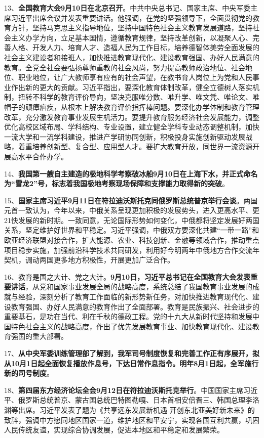 13、{\textbf{全国教育大会9月10日在北京召开}}。中共中央总书记、国家主席、中央军委主席习近平出席会议并发表重要讲话。他强调，在党的坚强领导下，全面贯彻党的教育方针，坚持马克思主义指导地位，坚持中国特色社会主义教育发展道路，坚持社会主义办学方向，立足基本国情，遵循教育规律，坚持改革创新，以凝聚人心、完善人格、开发人力、培育人才、造福人民为工作目标，培养德智体美劳全面发展的社会主义建设者和接班人，加快推进教育现代化、建设教育强国、办好人民满意的教育。全党全社会要弘扬尊师重教的社会风尚，努力提高教师政治地位、社会地位、职业地位，让广大教师享有应有的社会声望，在教书育人岗位上为党和人民事业作出新的更大的贡献。习近平指出，要深化教育体制改革，健全立德树人落实机制，扭转不科学的教育评价导向，坚决克服唯分数、唯升学、唯文凭、唯论文、唯帽子的顽瘴痼疾，从根本上解决教育评价指挥棒问题。要深化办学体制和教育管理改革，充分激发教育事业发展生机活力。要提升教育服务经济社会发展能力，调整优化高校区域布局、学科结构、专业设置，建立健全学科专业动态调整机制，加快一流大学和一流学科建设，推进产学研协同创新，积极投身实施创新驱动发展战略，着重培养创新型、复合型、应用型人才。要扩大教育开放，同世界一流资源开展高水平合作办学。

14、{\textbf{我国第一艘自主建造的极地科学考察破冰船9月10日在上海下水，并正式命名为``雪龙2''号，标志着我国极地考察现场保障和支撑能力取得新的突破}}。

15、{\textbf{国家主席习近平9月11日在符拉迪沃斯托克同俄罗斯总统普京举行会谈}}。两国元首一致认为，今年以来，中俄关系呈现更加积极的发展势头，进入更高水平、更21快发展的新时期。一致同意，无论国际形势如何变化，中俄都将坚定发展好两国关系，坚定维护好世界和平稳定。习近平强调，中俄双方要深化共建``一带一路''和欧亚经济联盟对接合作，扩大能源、农业、科技创新、金融等领域合作，推动重点项目稳步实施，加强前沿科学技术共同研发，利用好今明两年中俄地方合作交流年契机，调动两国更多地方积极性，开展更加广泛合作。

16、教育是国之大计、党之大计。{\textbf{9月10日，习近平总书记在全国教育大会发表重要讲话}}，从党和国家事业发展全局的战略高度，系统总结了我国教育事业发展的成就与经验，深刻分析了教育工作面临的新形势新任务，对加快推进教育现代化、建设教育强国、办好人民满意的教育作出了全面部署。教育是民族振兴、社会进步的重要基石，是功在当代、利在千秋的德政工程。党的十九大从新时代坚持和发展中国特色社会主义的战略高度，作出了优先发展教育事业、加快教育现代化、建设教育强国的重大部署。

17、{\textbf{从中央军委训练管理部了解到，我军司号制度恢复和完善工作正有序展开，拟从10月1日起全面恢复播放作息号，下达日常作息指令。明年8月1日起，全军施行新的司号制度}}。

18、{\textbf{第四届东方经济论坛全会9月12日在符拉迪沃斯托克举行}}。中国国家主席习近平、俄罗斯总统普京、蒙古国总统巴特图勒嘎、日本首相安倍晋三、韩国总理李洛渊等出席。习近平发表了题为《共享远东发展新机遇
开创东北亚美好新未来》的致辞，强调中方愿同地区国家一道，维护地区和平安宁，实现各国互利共赢，巩固人民传统友谊，实现综合协调发展，促进本地区和平稳定和发展繁荣。

